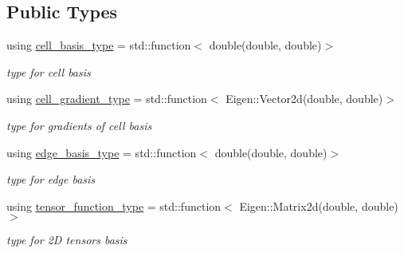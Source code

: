\subsection*{Public Types}
\begin{DoxyCompactItemize}
\item 
\mbox{\label{classHArDCore2D_1_1HybridCore_a4b9c53f6ec13dc9e73f5cdc5c8ae782b}} 
using \hyperlink{classHArDCore2D_1_1HybridCore_a4b9c53f6ec13dc9e73f5cdc5c8ae782b}{cell\+\_\+basis\+\_\+type} = std\+::function$<$ double(double, double)$>$
\begin{DoxyCompactList}\small\item\em type for cell basis \end{DoxyCompactList}\item 
\mbox{\label{classHArDCore2D_1_1HybridCore_a41350d7c3ac5a5a5e932348d2c9d0750}} 
using \hyperlink{classHArDCore2D_1_1HybridCore_a41350d7c3ac5a5a5e932348d2c9d0750}{cell\+\_\+gradient\+\_\+type} = std\+::function$<$ Eigen\+::\+Vector2d(double, double)$>$
\begin{DoxyCompactList}\small\item\em type for gradients of cell basis \end{DoxyCompactList}\item 
\mbox{\label{classHArDCore2D_1_1HybridCore_a1f2030ea16722179fd3523e6e6675948}} 
using \hyperlink{classHArDCore2D_1_1HybridCore_a1f2030ea16722179fd3523e6e6675948}{edge\+\_\+basis\+\_\+type} = std\+::function$<$ double(double, double)$>$
\begin{DoxyCompactList}\small\item\em type for edge basis \end{DoxyCompactList}\item 
\mbox{\label{classHArDCore2D_1_1HybridCore_ad9a6cc8ee2f9d26c936c5c61c358b538}} 
using \hyperlink{classHArDCore2D_1_1HybridCore_ad9a6cc8ee2f9d26c936c5c61c358b538}{tensor\+\_\+function\+\_\+type} = std\+::function$<$ Eigen\+::\+Matrix2d(double, double)$>$
\begin{DoxyCompactList}\small\item\em type for 2D tensors basis \end{DoxyCompactList}\end{DoxyCompactItemize}
